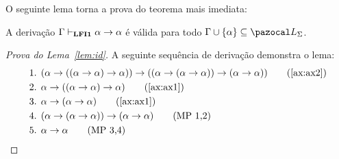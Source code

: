         O seguinte lema torna a prova do teorema mais imediata:
        \begin{lema}\label{lem:id}
            A derivação $\Gamma \vdash_{{\normalfont\textbf{LFI1}}{}} \alpha \to \alpha$ é válida para todo $\Gamma \cup \{\alpha\} \subseteq \ling{}$.
        \end{lema}
        
        \begin{proof}[Prova do Lema~\ref{lem:id}]
            A seguinte sequência de derivação demonstra o lema:
            \begin{align*}
                & \text{1. } (\alpha \to ((\alpha \to \alpha) \to \alpha)) \to ((\alpha \to (\alpha \to \alpha)) \to (\alpha \to \alpha))\tag{\ref{ax:ax2}}\\
                & \text{2. } \alpha \to ((\alpha \to \alpha) \to \alpha)\tag{\ref{ax:ax1}}\\
                & \text{3. } \alpha \to (\alpha \to \alpha)\tag{\ref{ax:ax1}}\\
                & \text{4. } (\alpha \to (\alpha \to \alpha)) \to (\alpha \to \alpha)\tag{MP 1,2}\\
                & \text{5. } \alpha \to \alpha\tag{MP 3,4}
            \end{align*}
        \end{proof}

